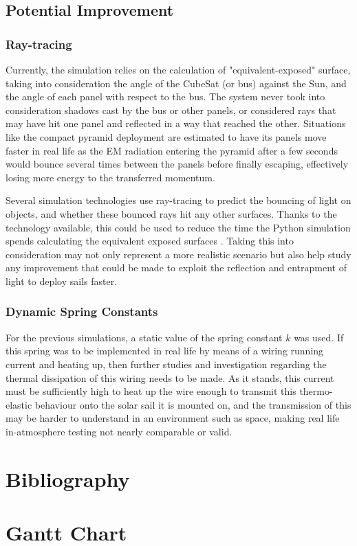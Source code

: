 \subsection{Potential Improvement}
\subsubsection{Ray-tracing}

Currently, the simulation relies on the calculation of "equivalent-exposed" surface, taking into consideration the angle of the CubeSat (or bus) against the Sun, and the angle of each panel with respect to the bus. The system never took into consideration shadows cast by the bus or other panels, or considered rays that may have hit one panel and reflected in a way that reached the other. Situations like the compact pyramid deployment are estimated to have its panels move faster in real life as the EM radiation entering the pyramid after a few seconds would bounce several times between the panels before finally escaping, effectively losing more energy to the transferred momentum.

Several simulation technologies use ray-tracing to predict the bouncing of light on objects, and whether these bounced rays hit any other surfaces. Thanks to the technology available, this could be used to reduce the time the Python simulation spends calculating the equivalent exposed surfaces \cite{RayTracing}. Taking this into consideration may not only represent a more realistic scenario but also help study any improvement that could be made to exploit the reflection and entrapment of light to deploy sails faster.


\subsubsection{Dynamic Spring Constants}

For the previous simulations, a static value of the spring constant $k$ was used. If this spring was to be implemented in real life by means of a wiring running current and heating up, then further studies and investigation regarding the thermal dissipation of this wiring needs to be made. As it stands, this current must be sufficiently high to heat up the wire enough to transmit this thermo-elastic behaviour onto the solar sail it is mounted on, and the transmission of this may be harder to understand in an environment such as space, making real life in-atmosphere testing not nearly comparable or valid.


\pagebreak

\section{Bibliography}

\pagebreak
\appendix
\pagebreak
\section{Gantt Chart} \label{gantt}


